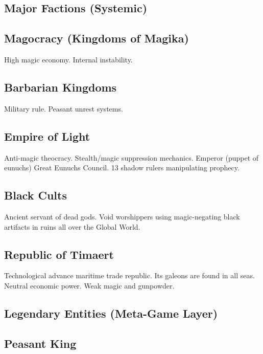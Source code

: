 \subsection{Major Factions (Systemic)}


\subsection{Magocracy (Kingdoms of Magika)}

High magic economy. Internal instability.

\subsection{Barbarian Kingdoms}

Military rule. Peasant unrest systems.

\subsection{Empire of Light}

Anti-magic theocracy. Stealth/magic suppression mechanics.
Emperor (puppet of eunuchs)
Great Eunuchs Council.
13 shadow rulers manipulating prophecy.

\subsection{Black Cults}

Ancient servant of dead gods.
Void worshippers using magic-negating black artifacts in ruins all over the Global World.

\subsection{Republic of Timaert}

Technological advance maritime trade republic. Its galeons are found in all seas. Neutral economic power. Weak magic and gunpowder.


\subsection{Legendary Entities (Meta-Game Layer)}

\subsection{Peasant King}

